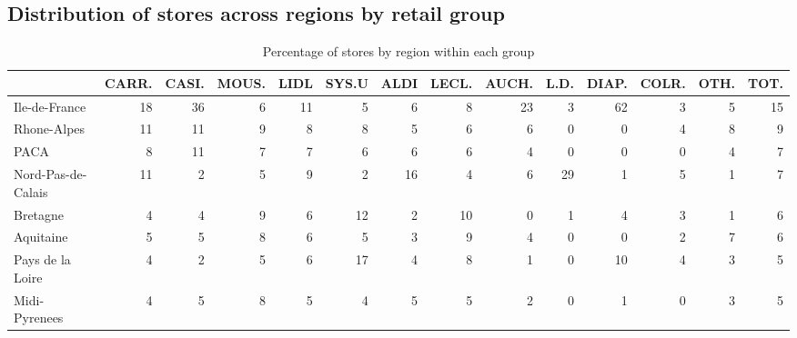 \documentclass[11pt]{article}
\begin{document}
\subsection{Distribution of stores across regions by retail group}


\begin{table}[H]
\caption{Percentage of stores by region within each group}
\footnotesize
\setlength{\tabcolsep}{2pt}

\begin{tabular}{lrrrrrrrrrrrrr}
\toprule
{} &      CARR. &      CASI. &      MOUS. &       LIDL &      SYS.U &       ALDI &      LECL. &      AUCH. &       L.D. &      DIAP. &      COLR. &       OTH. &       TOT. \\
\midrule
Ile-de-France        &         18 &         36 &          6 &         11 &          5 &          6 &          8 &         23 &          3 &         62 &          3 &          5 &         15 \\
Rhone-Alpes          &         11 &         11 &          9 &          8 &          8 &          5 &          6 &          6 &          0 &          0 &          4 &          8 &          9 \\
PACA                 &          8 &         11 &          7 &          7 &          6 &          6 &          6 &          4 &          0 &          0 &          0 &          4 &          7 \\
Nord-Pas-de-Calais   &         11 &          2 &          5 &          9 &          2 &         16 &          4 &          6 &         29 &          1 &          5 &          1 &          7 \\
Bretagne             &          4 &          4 &          9 &          6 &         12 &          2 &         10 &          0 &          1 &          4 &          3 &          1 &          6 \\
Aquitaine            &          5 &          5 &          8 &          6 &          5 &          3 &          9 &          4 &          0 &          0 &          2 &          7 &          6 \\
Pays de la Loire     &          4 &          2 &          5 &          6 &         17 &          4 &          8 &          1 &          0 &         10 &          4 &          3 &          5 \\
Midi-Pyrenees        &          4 &          5 &          8 &          5 &          4 &          5 &          5 &          2 &          0 &          1 &          0 &          3 &          5 \\

\end{tabular}
\end{table}
\end{document}

